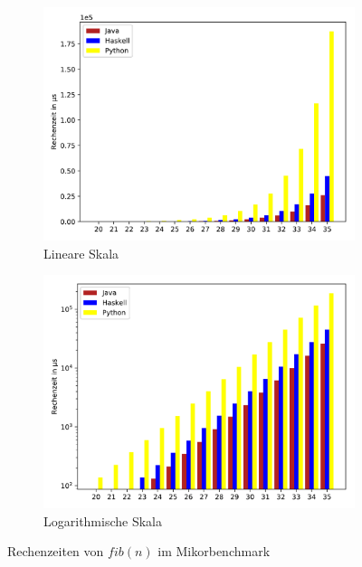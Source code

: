 \documentclass[11pt, parskip=half]{scrartcl}       %
\begin{document}
\begin{figure}[h]
  \centering
  \begin{subfigure}{0.5\textwidth}
    \centering
    \includegraphics[width=\textwidth]{src/linear-microbench.pdf}
    \caption{Lineare Skala}
    \label{fig:micro-lin}
  \end{subfigure}%
  \begin{subfigure}{0.5\textwidth}
    \centering
    \includegraphics[width=\textwidth]{src/log-microbench.pdf}
    \caption{Logarithmische Skala}
    \label{fig:micro-log}
  \end{subfigure}
  \caption{Rechenzeiten von $fib(n)$ im Mikorbenchmark}
  \label{fig:micro}
\end{figure}
\end{document}
